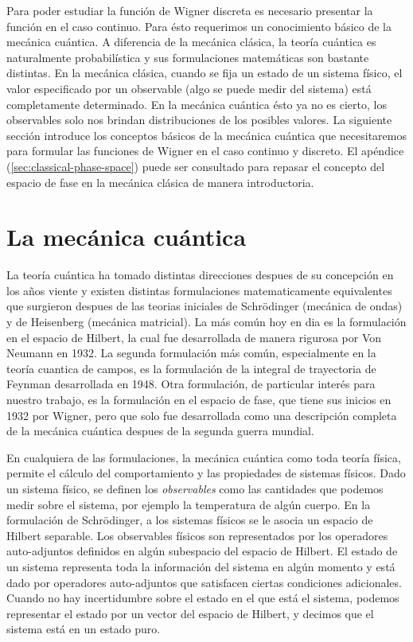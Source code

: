\documentclass[a4paper]{report}
\begin{document}
  Para poder estudiar la función de Wigner discreta es
  necesario presentar la función en el caso continuo. Para
  ésto requerimos un conocimiento básico de la mecánica
  cuántica. A diferencia de la mecánica clásica, la teoría
  cuántica es naturalmente probabilística y sus
  formulaciones matemáticas son bastante distintas. En la
  mecánica clásica, cuando se fija un estado de un sistema
  físico, el valor especificado por un observable (algo se
  puede medir del sistema) está completamente determinado.
  En la mecánica cuántica ésto ya no es cierto, los
  observables solo nos brindan distribuciones de los
  posibles valores. La siguiente sección introduce los
  conceptos básicos de la mecánica cuántica que
  necesitaremos para formular las funciones de Wigner en el
  caso continuo y discreto. El apéndice
  (\ref{sec:classical-phase-space}) puede ser consultado
  para repasar el concepto del espacio de fase en la
  mecánica clásica de manera introductoria. 

  \section{La mecánica cuántica}

  La teoría cuántica ha tomado distintas direcciones despues
  de su concepción en los años viente y existen distintas
  formulaciones matematicamente equivalentes que surgieron
  despues de las teorias iniciales de Schrödinger (mecánica
  de ondas) y de Heisenberg (mecánica matricial).  La más
  común hoy en dia es la formulación en el espacio de
  Hilbert, la cual fue desarrollada de manera rigurosa por
  Von Neumann en 1932.  La segunda formulación más común,
  especialmente en la teoría cuantica de campos, es la
  formulación de la integral de trayectoria de Feynman
  desarrollada en 1948.  Otra formulación, de particular
  interés para nuestro trabajo, es la formulación en el
  espacio de fase, que tiene sus inicios en 1932 por Wigner,
  pero que solo fue desarrollada como una descripción
  completa de la mecánica cuántica despues de la segunda
  guerra mundial. 

  En cualquiera de las formulaciones, la mecánica cuántica
  como toda teoría física, permite el cálculo del
  comportamiento y las propiedades de sistemas físicos. Dado
  un sistema físico, se definen los \textit{observables}
  como las cantidades que podemos medir sobre el sistema,
  por ejemplo la temperatura de algún cuerpo. En la
  formulación de Schrödinger, a los sistemas físicos se le
  asocia un espacio de Hilbert separable. Los observables
  físicos son representados por los operadores auto-adjuntos
  definidos en algún subespacio del espacio de Hilbert. El
  estado de un sistema representa toda la información del
  sistema en algún momento y está dado por operadores
  auto-adjuntos que satisfacen ciertas condiciones
  adicionales. Cuando no hay incertidumbre sobre el estado
  en el que está el sistema, podemos representar el estado
  por un vector del espacio de Hilbert, y decimos que el
  sistema está en un estado puro.
\end{document}
